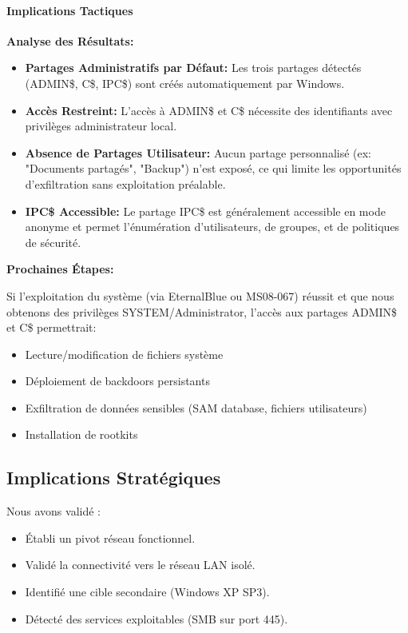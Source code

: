 \documentclass[12pt,a4paper,openany]{report}
\begin{document}
	\paragraph{Implications Tactiques}
	
	\textbf{Analyse des Résultats:}
	\begin{itemize}
		\item \textbf{Partages Administratifs par Défaut:} Les trois partages
		détectés (ADMIN\$, C\$, IPC\$) sont créés automatiquement par Windows.
		
		\item \textbf{Accès Restreint:} L'accès à ADMIN\$ et C\$ nécessite des
		identifiants avec privilèges administrateur local.
		
		\item \textbf{Absence de Partages Utilisateur:} Aucun partage personnalisé
		(ex: "Documents partagés", "Backup") n'est exposé, ce qui limite
		les opportunités d'exfiltration sans exploitation préalable.
		
		\item \textbf{IPC\$ Accessible:} Le partage IPC\$ est généralement accessible
		en mode anonyme et permet l'énumération d'utilisateurs, de groupes,
		et de politiques de sécurité.
	\end{itemize}
	
	\textbf{Prochaines Étapes:}
	
	Si l'exploitation du système (via EternalBlue ou MS08-067) réussit et que
	nous obtenons des privilèges SYSTEM/Administrator, l'accès aux partages
	ADMIN\$ et C\$ permettrait:
	\begin{itemize}
		\item Lecture/modification de fichiers système
		\item Déploiement de backdoors persistants
		\item Exfiltration de données sensibles (SAM database, fichiers utilisateurs)
		\item Installation de rootkits
	\end{itemize}
	
	\subsection{Implications Stratégiques}
	
	Nous avons validé :
	\begin{itemize}
		\item \textcolor{green}{\checkmark} Établi un pivot réseau fonctionnel.
		\item \textcolor{green}{\checkmark} Validé la connectivité vers le réseau LAN isolé.
		\item \textcolor{green}{\checkmark} Identifié une cible secondaire (Windows XP SP3).
		\item \textcolor{green}{\checkmark} Détecté des services exploitables (SMB sur port 445).
	\end{itemize}
	
\end{document}

